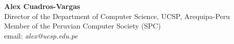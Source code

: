 \textbf{Alex Cuadros-Vargas}\\
Director of the Department of Computer Science, UCSP, Arequipa-Peru\\
Member of the Peruvian Computer Society (SPC)\\
email: \textit{alex@ucsp.edu.pe}
